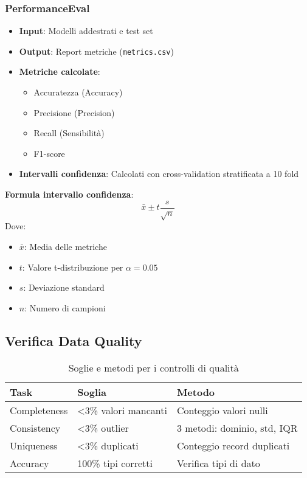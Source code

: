 \documentclass[a4paper, 12pt]{article}
\begin{document}
\subsubsection{PerformanceEval}
\begin{itemize}
    \item \textbf{Input}: Modelli addestrati e test set
    \item \textbf{Output}: Report metriche (\texttt{metrics.csv})
    \item \textbf{Metriche calcolate}:
    \begin{itemize}
        \item Accuratezza (Accuracy)
        \item Precisione (Precision)
        \item Recall (Sensibilità)
        \item F1-score
    \end{itemize}
    \item \textbf{Intervalli confidenza}: Calcolati con cross-validation stratificata a 10 fold
\end{itemize}

\begin{teoria}
    \textbf{Formula intervallo confidenza}:
    \[
    \bar{x} \pm t \frac{s}{\sqrt{n}}
    \]
    Dove:
    \begin{itemize}
        \item \(\bar{x}\): Media delle metriche
        \item \(t\): Valore t-distribuzione per \(\alpha = 0.05\)
        \item \(s\): Deviazione standard
        \item \(n\): Numero di campioni
    \end{itemize}
\end{teoria}

\subsection{Verifica Data Quality}

\begin{table}[h]
\centering
\begin{tabular}{l l l}
\toprule
\textbf{Task} & \textbf{Soglia} & \textbf{Metodo} \\
\midrule
Completeness & <3\% valori mancanti & Conteggio valori nulli \\
Consistency & <3\% outlier & 3 metodi: dominio, std, IQR \\
Uniqueness & <3\% duplicati & Conteggio record duplicati \\
Accuracy & 100\% tipi corretti & Verifica tipi di dato \\
\bottomrule
\end{tabular}
\caption{Soglie e metodi per i controlli di qualità}
\label{tab:dq_checks}
\end{table}
\end{document}
